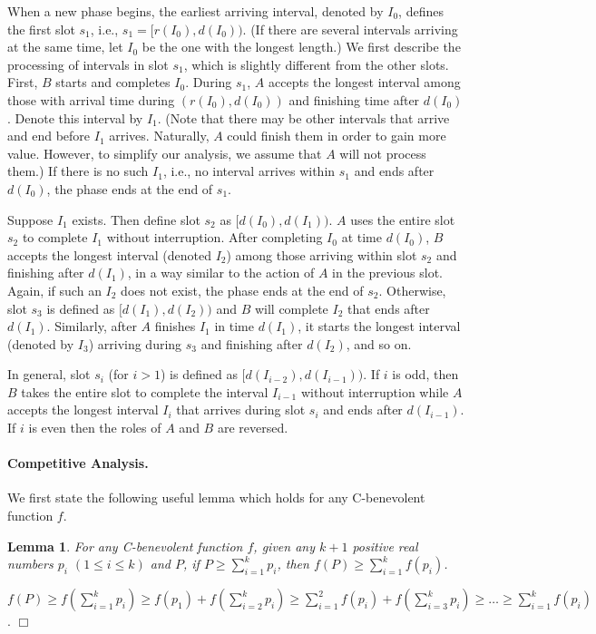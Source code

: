 \documentclass[11pt]{article}
\newtheorem{lemma}{Lemma}[section]
\newcommand{\qed}{\hspace*{\fill}$\Box$\par\medskip}
\newenvironment{proof}{\noindent{\it Proof. }\ignorespaces}{\qed}
\begin{document}
When a new phase begins,
the earliest arriving interval, denoted by $I_0$, defines the
first slot $s_1$, i.e., $s_1 = [r(I_0), d(I_0))$.
(If there are several intervals arriving at the same time,
let $I_0$ be the one with the longest length.)
We first describe the processing of intervals in slot $s_1$,
which is slightly different from the other slots.
First, $B$ starts and completes $I_0$.  
During $s_1$, $A$ accepts the longest interval among those
with arrival time during $(r(I_0), d(I_0))$ and finishing time 
after $d(I_0)$. 
Denote this interval by $I_1$.
(Note that there may be other intervals that arrive and end 
before $I_1$ arrives. 
Naturally, $A$ could finish them in order to gain more value.
However, to simplify our analysis, we assume that $A$ will not
process them.)
If there is no such $I_1$,
i.e., no interval arrives within $s_1$ and ends after $d(I_0)$,
the phase ends at the end of $s_1$.

Suppose $I_1$ exists.
Then define slot $s_2$ as $[d(I_0), d(I_1))$.
$A$ uses the entire slot $s_2$ to complete $I_1$ without interruption.
After completing $I_0$ at time $d(I_0)$, 
$B$ accepts the longest interval (denoted $I_2$)
among those arriving within slot $s_2$ and finishing after $d(I_1)$,
in a way similar to the action of $A$ in the previous slot.
Again, if such an $I_2$ does not exist, 
the phase ends at the end of $s_2$.
Otherwise, slot $s_3$ is defined as $[d(I_1), d(I_2))$
and $B$ will complete $I_2$ that ends after $d(I_1)$.
Similarly, after $A$ finishes $I_1$ in time $d(I_1)$,
it starts the longest interval (denoted by $I_3$)
arriving during $s_3$ and finishing after $d(I_2)$, and so on.

In general, slot $s_i$ (for $i>1$) is defined as $[d(I_{i-2}), d(I_{i-1}))$.
If $i$ is odd, then $B$ takes the entire slot to complete the interval
$I_{i-1}$ without interruption while $A$ accepts the longest interval 
$I_{i}$ that arrives during slot $s_i$ and ends after $d(I_{i-1})$.  
If $i$ is even then the roles of $A$ and $B$ are reversed.

\paragraph{Competitive Analysis.}

We first state the
following useful lemma which holds for any C-benevolent function $f$.

\begin{lemma} \label{l1}
For any C-benevolent function $f$, given any $k+1$ positive
real numbers $p_i$ $(1\leq i\leq k)$ and $P$, if $P\geq \sum^k_{i=1}
p_i$, then $f(P)\geq \sum^k_{i=1} f(p_i)$.
\end{lemma}
\begin{proof}
$f(P)\geq f(\sum^k_{i=1} p_i) \geq f(p_1)+ f(\sum^k_{i=2}
p_i)\geq \sum^2_{i=1}f(p_i)+f(\sum^k_{i=3} p_i)\geq \ldots\geq
\sum^k_{i=1} f(p_i)$.  
\end{proof}
\end{document}
